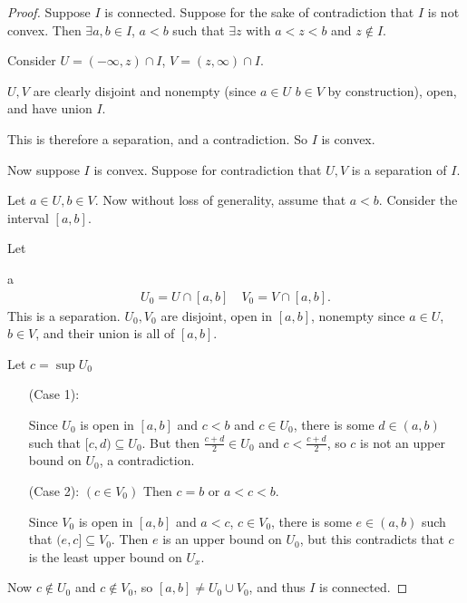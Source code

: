 \documentclass[12pt, twosided]{article}
\begin{document}
\begin{proof}
  Suppose \(I\) is connected. Suppose for the sake of contradiction that \(I\) is not convex. Then \(\exists a,b \in I\), \(a < b\) such that \(\exists z\) with \(a < z < b\) and \(z \not\in I\).

  Consider \(U = (-\infty, z) \cap I\), \(V= (z, \infty) \cap I\).

  \(U, V\) are clearly disjoint and nonempty (since \(a \in U\) \(b \in V\) by construction), open, and have union \(I\).

  This is therefore a separation, and a contradiction. So \(I\) is convex.

  Now suppose \(I\) is convex. Suppose for contradiction that \(U, V\) is a separation of \(I\).

  Let \(a \in U, b\in V\). Now without loss of generality, assume that \(a < b\). Consider the interval \([a,b]\).

  Let

  a
  \begin{align*}
    U_0 = U \cap [a,b] \quad V_0 = V \cap [a, b].
  \end{align*}
  This is a separation. \(U_0, V_0\) are disjoint, open in \([a,b]\), nonempty since \(a \in U\), \(b \in V\), and their union is all of \([a,b]\).

  Let \(c = \sup U_0\)

  \begin{enumerate}
  \item [(Case 1):]\hspace{1em}

    \begin{center}
    \end{center}
    Since \(U_0\) is open in \([a,b]\) and \(c < b\) and \(c \in U_0\), there is some \(d \in (a,b)\) such that \([c, d) \subseteq U_0\). But then \(\frac{c + d}{2} \in U_0\) and \(c < \frac{c + d}{2}\), so \(c\) is not an upper bound on \(U_0\), a contradiction.

    
  \item [(Case 2):] \((c \in V_0)\) Then \(c = b\) or \(a < c < b\).

    Since \(V_0\) is open in \([a,b]\) and \(a < c\), \(c \in V_0\), there is some \(e \in (a, b)\) such that \((e,c] \subseteq V_0\). Then \(e\) is an upper bound on \(U_0\), but this contradicts that \(c\) is the least upper bound on \(U_x\).
    
  \end{enumerate}

  Now \(c \not\in U_0\) and \(c \not\in V_0\), so \([a,b] \neq U_0 \cup V_0\), and thus \(I\) is connected.
\end{proof}
\end{document}

